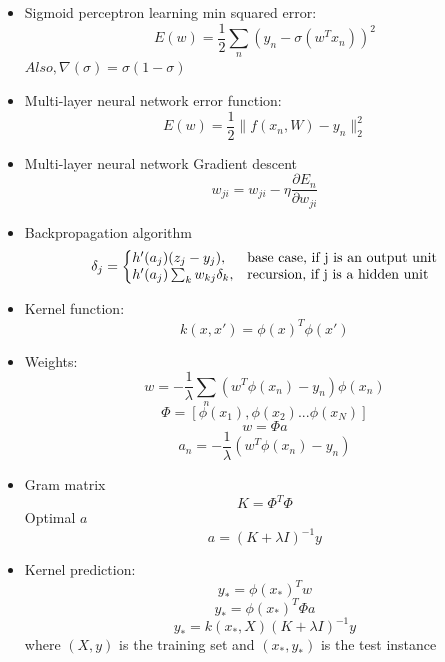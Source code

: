 \documentclass[parskip=half]{scrartcl}
\begin{document}
\begin{itemize}
        \item
        Sigmoid perceptron learning min squared error:
        $$E(w) = \frac{1}{2} \sum_n (y_n - \sigma(w^T x_n))^2 $$
        $Also, \nabla(\sigma) = \sigma(1 - \sigma)$

        \item 
        Multi-layer neural network error function:
        $$E(w) = \frac{1}{2} \lVert f(x_n, W) - y_n \rVert_2^2 $$

        \item 
        Multi-layer neural network Gradient descent
        $$w_{ji} = w_{ji} - \eta \frac{\partial E_n}{\partial w_{ji}} $$

        \item 
        Backpropagation algorithm
        \begin{equation*}
        \delta_j = \left\{
        \begin{array}{@{}ll@{}}
        h'(a_j) (z_j - y_j), & \text{base case, if j is an output unit} \\
        h'(a_j) \sum_k w_{kj}\delta_k, & \text{recursion, if j is a hidden unit}
        \end{array}\right.
        \end{equation*} 

        \item 
        Kernel function:
        $$k(x, x') = \phi(x)^T \phi(x') $$

        \item 
        Weights:
        $$w = - \frac{1}{\lambda} \sum_n (w^T \phi(x_n) - y_n) \phi(x_n) $$
        $$\Phi = [\phi(x_1), \phi(x_2) ... \phi(x_N)] $$
        $$w = \Phi a $$
        $$a_n = - \frac{1}{\lambda} (w^T \phi(x_n) - y_n) $$

        \item 
        Gram matrix
        $$K = \Phi^T \Phi$$
        Optimal $a$
        $$a = (K + \lambda I)^{-1} y $$

        \item 
        Kernel prediction:
        $$y_* = \phi(x_*)^T w $$
        $$y_* = \phi(x_*)^T \Phi a $$
        $$y_* = k(x_*, X) (K + \lambda I)^{-1} y $$
        where $(X, y)$ is the training set and $(x_*, y_*)$ is the test instance


\end{itemize}
\end{document}
